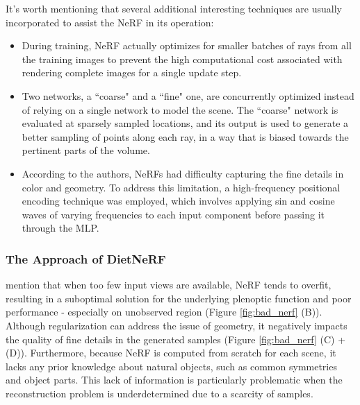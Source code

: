 \documentclass{article}
\begin{document}
\medskip
\noindent
It's worth mentioning that several additional interesting techniques are usually incorporated to assist the NeRF in its operation:
\begin{itemize}
    \item
        During training, NeRF actually optimizes for smaller batches of rays from all the training images to prevent the high computational cost associated with rendering complete images for a single update step.
    \item
        Two networks, a ``coarse" and a ``fine" one, are concurrently optimized instead of relying on a single network to model the scene. The ``coarse" network is evaluated at sparsely sampled locations, and its output is used to generate a better sampling of points along each ray, in a way that is biased towards the pertinent parts of the volume.
    \item
        According to the authors, NeRFs had difficulty capturing the fine details in color and geometry. To address this limitation, a high-frequency positional encoding technique was employed, which involves applying sin and cosine waves of varying frequencies to each input component before passing it through the MLP.
\end{itemize}


\subsubsection{The Approach of DietNeRF}
\label{subsec:dietnerf}

\citet{Jain_2021_dietnerf} mention that when too few input views are available, NeRF tends to overfit, resulting in a suboptimal solution for the underlying plenoptic function and poor performance - especially on unobserved region (Figure \ref{fig:bad_nerf} (B)). Although regularization can address the issue of geometry, it negatively impacts the quality of fine details in the generated samples (Figure \ref{fig:bad_nerf} (C) + (D)). Furthermore, because NeRF is computed from scratch for each scene, it lacks any prior knowledge about natural objects, such as common symmetries and object parts. This lack of information is particularly problematic when the reconstruction problem is underdetermined due to a scarcity of samples.
\end{document}
